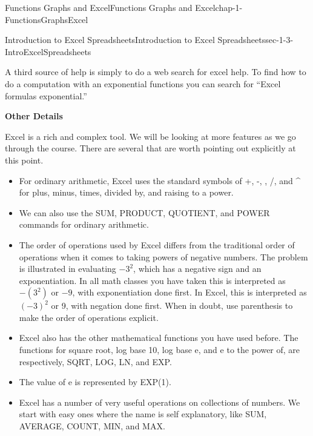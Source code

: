 \documentclass[oneside,10pt,]{book}
\newcommand{\terminology}[1]{\textbf{#1}}
\numberwithin{equation}{section}
\begin{document}
\begin{chapterptx}{Functions Graphs and Excel}{}{Functions Graphs and Excel}{}{}{chap-1-FunctionsGraphsExcel}
\begin{sectionptx}{Introduction to Excel Spreadsheets}{}{Introduction to Excel Spreadsheets}{}{}{sec-1-3-IntroExcelSpreadsheets}
\begin{sidebyside}{1}{0.1}{0.1}{0}
\begin{sbspanel}{0.8}
\end{sbspanel}%
\end{sidebyside}%
\par
\hypertarget{p-270}{}%
A third source of help is simply to do a web search for excel help.  To find how to do a computation with an exponential functions you can search for “Excel formulas exponential.”%
\par
\hypertarget{p-271}{}%
\terminology{Other Details}%
\par
\hypertarget{p-272}{}%
Excel is a rich and complex tool.  We will be looking at more features as we go through the course.  There are several that are worth pointing out explicitly at this point.%
\leavevmode%
\begin{itemize}[label=\textbullet]
\item{}\hypertarget{p-273}{}%
For ordinary arithmetic, Excel uses the standard symbols of +, -, \textasteriskcentered{}, \slash{}, and \textasciicircum{} for plus, minus, times, divided by, and raising to a power.%
\item{}\hypertarget{p-274}{}%
We can also use the SUM, PRODUCT, QUOTIENT, and POWER commands for ordinary arithmetic.%
\item{}\hypertarget{p-275}{}%
The order of operations used by Excel differs from the traditional order of operations when it comes to taking powers of negative numbers.  The problem is illustrated in evaluating  \(-3^2\), which has a negative sign and an exponentiation. In all math classes you have taken this is interpreted as \(-(3^2)\) or \(-9\), with exponentiation done first.  In Excel, this is interpreted as \((-3)^2\) or 9, with negation done first.  When in doubt, use parenthesis to make the order of operations explicit.%
\item{}\hypertarget{p-276}{}%
Excel also has the other mathematical functions you have used before.  The functions for square root, log base 10, log base e, and e to the power of, are respectively, SQRT, LOG, LN, and EXP.%
\item{}\hypertarget{p-277}{}%
The value of e is represented by EXP(1).%
\item{}\hypertarget{p-278}{}%
Excel has a number of very useful operations on collections of numbers.  We start with easy ones where the name is self explanatory, like SUM, AVERAGE, COUNT, MIN, and MAX.%
\end{itemize}
%
%
\typeout{************************************************}
\typeout{************************************************}

\end{sectionptx}
\end{chapterptx}
\end{document}
